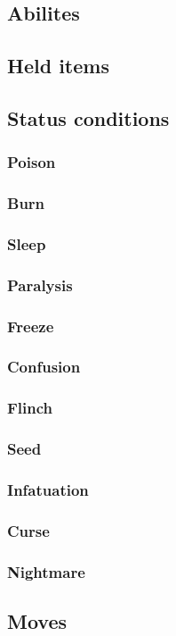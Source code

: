 \subsection{Abilites}
\subsection{Held items}
\subsection{Status conditions}
\subsubsection{Poison}
\subsubsection{Burn}
\subsubsection{Sleep}
\subsubsection{Paralysis}
\subsubsection{Freeze}
\subsubsection{Confusion}
\subsubsection{Flinch}
\subsubsection{Seed}
\subsubsection{Infatuation}
\subsubsection{Curse}
\subsubsection{Nightmare}
\subsection{Moves}
